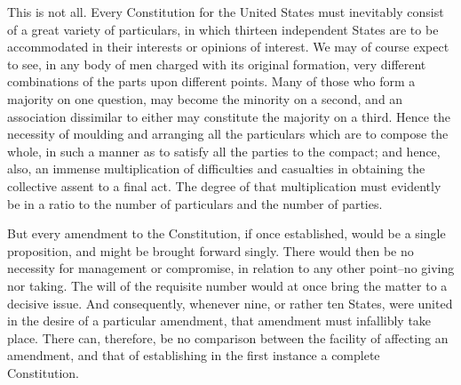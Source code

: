 This is not all. Every Constitution for the United States must inevitably consist of a great variety of particulars, in which thirteen independent States are to be accommodated in their interests or opinions of interest. We may of course expect to see, in any body of men charged with its original formation, very different combinations of the parts upon different points. Many of those who form a majority on one question, may become the minority on a second, and an association dissimilar to either may constitute the majority on a third. Hence the necessity of moulding and arranging all the particulars which are to compose the whole, in such a manner as to satisfy all the parties to the compact; and hence, also, an immense multiplication of difficulties and casualties in obtaining the collective assent to a final act. The degree of that multiplication must evidently be in a ratio to the number of particulars and the number of parties.

But every amendment to the Constitution, if once established, would be a single proposition, and might be brought forward singly. There would then be no necessity for management or compromise, in relation to any other point--no giving nor taking. The will of the requisite number would at once bring the matter to a decisive issue. And consequently, whenever nine, or rather ten States, were united in the desire of a particular amendment, that amendment must infallibly take place. There can, therefore, be no comparison between the facility of affecting an amendment, and that of establishing in the first instance a complete Constitution.

